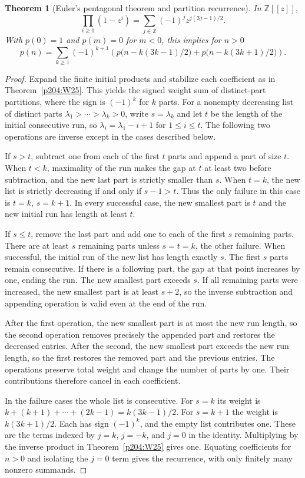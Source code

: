 \documentclass[11pt,oneside,openany]{book}
\theoremstyle{plain}
\newtheorem{theorem}{Theorem}[chapter]
\theoremstyle{definition}
\theoremstyle{remark}
\begin{document}
\begin{theorem}[Euler's pentagonal theorem and partition recurrence]
\label{p204:W29}
In \(\mathbb Z[[z]]\),
\[
 \prod_{i\ge1}(1-z^i)
    =\sum_{j\in\mathbb Z}(-1)^j z^{j(3j-1)/2}.
\]
With \(p(0)=1\) and \(p(m)=0\) for \(m<0\), this implies for \(n>0\)
\[
 p(n)=\sum_{k\ge1}(-1)^{k+1}
 \left(p\bigl(n-k(3k-1)/2\bigr)+p\bigl(n-k(3k+1)/2\bigr)\right).
\]
\end{theorem}
\begin{proof}
Expand the finite initial products and stabilize each coefficient
as in Theorem~\ref{p204:W25}. This yields the signed weight sum
of distinct-part partitions, where the sign is \((-1)^k\)
for \(k\) parts. For a nonempty decreasing list of distinct
parts \(\lambda_1>\cdots>\lambda_k>0\), write \(s=\lambda_k\)
and let \(t\) be the length of the initial consecutive run,
so \(\lambda_i=\lambda_1-i+1\) for \(1\le i\le t\).
The following two operations are inverse except in the cases
described below.

If \(s>t\), subtract one from each of the first \(t\) parts
and append a part of size \(t\). When \(t<k\), maximality of
the run makes the gap at \(t\) at least two before subtraction,
and the new last part is strictly smaller than \(s\).
When \(t=k\), the new list is strictly decreasing if and only
if \(s-1>t\). Thus the only failure in this case is \(t=k\),
\(s=k+1\). In every successful case, the new smallest part
is \(t\) and the new initial run has length at least \(t\).

If \(s\le t\), remove the last part and add one to each of
the first \(s\) remaining parts. There are at least \(s\)
remaining parts unless \(s=t=k\), the other failure. When
successful, the initial run of the new list has length exactly
\(s\). The first \(s\) parts remain consecutive. If there
is a following part, the gap at that point increases by one,
ending the run. The new smallest part exceeds \(s\). If all
remaining parts were increased, the new smallest part is at
least \(s+2\), so the inverse subtraction and appending
operation is valid even at the end of the run.

After the first operation, the new smallest part is at most
the new run length, so the second operation removes precisely
the appended part and restores the decreased entries. After
the second, the new smallest part exceeds the new run length,
so the first restores the removed part and the previous entries.
The operations preserve total weight and change the number of
parts by one. Their contributions therefore cancel in each
coefficient.

In the failure cases the whole list is consecutive. For \(s=k\)
its weight is \(k+(k+1)+\cdots+(2k-1)=k(3k-1)/2\). For
\(s=k+1\) the weight is \(k(3k+1)/2\). Each has sign
\((-1)^k\), and the empty list contributes one. These are the
terms indexed by \(j=k\), \(j=-k\), and \(j=0\) in the identity.
Multiplying by the inverse product in Theorem~\ref{p204:W25}
gives one. Equating coefficients for \(n>0\) and isolating
the \(j=0\) term gives the recurrence, with only finitely many
nonzero summands.
\end{proof}
\end{document}
